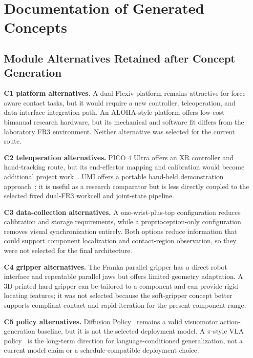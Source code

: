 \documentclass[12pt, letterpaper]{article}
\begin{document}
\appendix

\section{Documentation of Generated Concepts}
\subsection{Module Alternatives Retained after Concept Generation}

\textbf{C1 platform alternatives.} A dual Flexiv platform remains attractive for force-aware contact tasks, but it would require a new controller, teleoperation, and data-interface integration path. An ALOHA-style platform offers low-cost bimanual research hardware, but its mechanical and software fit differs from the laboratory FR3 environment. Neither alternative was selected for the current route.

\textbf{C2 teleoperation alternatives.} PICO 4 Ultra offers an XR controller and hand-tracking route, but its end-effector mapping and calibration would become additional project work~\cite{pico4ultra}. UMI offers a portable hand-held demonstration approach~\cite{umi}; it is useful as a research comparator but is less directly coupled to the selected fixed dual-FR3 workcell and joint-state pipeline.

\textbf{C3 data-collection alternatives.} A one-wrist-plus-top configuration reduces calibration and storage requirements, while a proprioception-only configuration removes visual synchronization entirely. Both options reduce information that could support component localization and contact-region observation, so they were not selected for the final architecture.

\textbf{C4 gripper alternatives.} The Franka parallel gripper has a direct robot interface and repeatable parallel jaws but offers limited geometry adaptation. A 3D-printed hard gripper can be tailored to a component and can provide rigid locating features; it was not selected because the soft-gripper concept better supports compliant contact and rapid iteration for the present component range.

\textbf{C5 policy alternatives.} Diffusion Policy~\cite{diffusionpolicy} remains a valid visuomotor action-generation baseline, but it is not the selected deployment model. A $\pi$-style VLA policy~\cite{pi0} is the long-term direction for language-conditioned generalization, not a current model claim or a schedule-compatible deployment choice.
\end{document}
